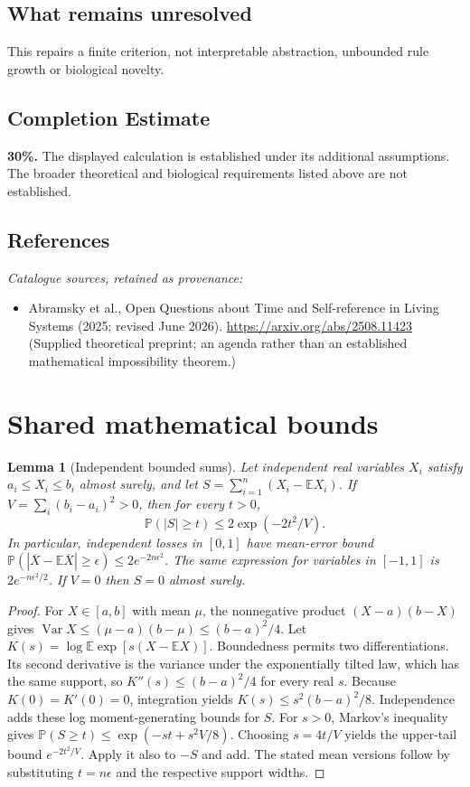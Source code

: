 \documentclass[11pt]{article}
\newcommand{\E}{\mathbb E}
\newcommand{\Prob}{\mathbb P}
\DeclareMathOperator{\Var}{Var}
\providecommand{\E}{\mathbb E}
\providecommand{\Prob}{\mathbb P}
\providecommand{\Var}{\operatorname{Var}}
\newtheorem{sharedlemma}{Lemma}[section]
\begin{document}
\subsection{What remains unresolved}
This repairs a finite criterion, not interpretable abstraction, unbounded rule growth or biological novelty.
\subsection{Completion Estimate}
\textbf{30\%.} The displayed calculation is established under its additional assumptions. The broader theoretical and biological requirements listed above are not established.
\subsection{References}
\noindent\emph{Catalogue sources, retained as provenance:}
\begin{itemize}
\item Abramsky et al., Open Questions about Time and Self-reference in Living Systems (2025; revised June 2026). \url{https://arxiv.org/abs/2508.11423} (Supplied theoretical preprint; an agenda rather than an established mathematical impossibility theorem.)
\end{itemize}
\clearpage


\appendix
\section{Shared mathematical bounds}\label{app:bounds}
\begin{sharedlemma}[Independent bounded sums]\label{lem:bounded}
Let independent real variables $X_i$ satisfy $a_i\leq X_i\leq b_i$ almost surely,
and let $S=\sum_{i=1}^n(X_i-\E X_i)$. If
$V=\sum_i(b_i-a_i)^2>0$, then for every $t>0$,
\[
 \Prob(|S|\geq t)\leq 2\exp(-2t^2/V).
\]
In particular, independent losses in $[0,1]$ have mean-error bound
$\Prob(|\overline X-\E\overline X|\geq\epsilon)
\leq2e^{-2n\epsilon^2}$. The same expression for variables in $[-1,1]$
is $2e^{-n\epsilon^2/2}$. If $V=0$ then $S=0$ almost surely.
\end{sharedlemma}
\begin{proof}
For $X\in[a,b]$ with mean $\mu$, the nonnegative product
$(X-a)(b-X)$ gives
$\Var X\leq(\mu-a)(b-\mu)\leq(b-a)^2/4$.
Let $K(s)=\log\E\exp[s(X-\E X)]$.
Boundedness permits two differentiations. Its second derivative is the variance
under the exponentially tilted law, which has the same support, so
$K''(s)\leq(b-a)^2/4$ for every real $s$.
Because $K(0)=K'(0)=0$, integration yields
$K(s)\leq s^2(b-a)^2/8$.
Independence adds these log moment-generating bounds for $S$.
For $s>0$, Markov's inequality gives
$\Prob(S\geq t)\leq\exp(-st+s^2V/8)$.
Choosing $s=4t/V$ yields the upper-tail bound $e^{-2t^2/V}$.
Apply it also to $-S$ and add. The stated mean versions follow by substituting
$t=n\epsilon$ and the respective support widths.
\end{proof}
\end{document}
